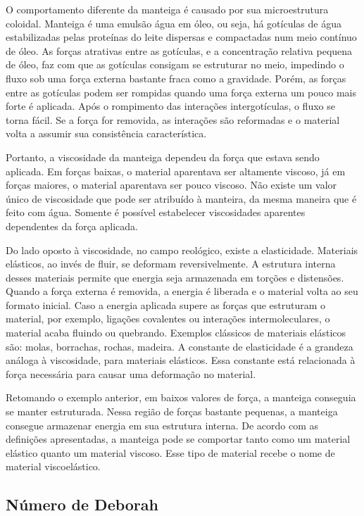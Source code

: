 		O comportamento diferente da manteiga é causado por sua microestrutura coloidal. Manteiga é uma emulsão água em óleo, ou seja, há gotículas de água estabilizadas pelas proteínas do leite dispersas e compactadas num meio contínuo de óleo. As forças atrativas entre as gotículas, e a concentração relativa pequena de óleo, faz com que as gotículas consigam se estruturar no meio, impedindo o fluxo sob uma força externa bastante fraca como a gravidade. Porém, as forças entre as gotículas podem ser rompidas quando uma força externa um pouco mais forte é aplicada. Após o rompimento das interações intergotículas, o fluxo se torna fácil. Se a força for removida, as interações são reformadas e o material volta a assumir sua consistência característica.
		
		Portanto, a viscosidade da manteiga dependeu da força que estava sendo aplicada. Em forças baixas, o material aparentava ser altamente viscoso, já em forças maiores, o material aparentava ser pouco viscoso. Não existe um valor único de viscosidade que pode ser atribuído à manteira, da mesma maneira que é feito com água. Somente é possível estabelecer viscosidades aparentes dependentes da força aplicada.
		
		Do lado oposto à viscosidade, no campo reológico, existe a elasticidade. Materiais elásticos, ao invés de fluir, se deformam reversivelmente. A estrutura interna desses materiais permite que energia seja armazenada em torções e distensões. Quando a força externa é removida, a energia é liberada e o material volta ao seu formato inicial. Caso a energia aplicada supere as forças que estruturam o material, por exemplo, ligações covalentes ou interações intermoleculares, o material acaba fluindo ou quebrando. Exemplos clássicos de materiais elásticos são: molas, borrachas, rochas, madeira. A constante de elasticidade é a grandeza análoga à viscosidade, para materiais elásticos. Essa constante está relacionada à força necessária para causar uma deformação no material.

		Retomando o exemplo anterior, em baixos valores de força, a manteiga conseguia se manter estruturada. Nessa região de forças bastante pequenas, a manteiga consegue armazenar energia em sua estrutura interna. De acordo com as definições apresentadas, a manteiga pode se comportar tanto como um material elástico quanto um material viscoso. Esse tipo de material recebe o nome de material viscoelástico.
		
		\subsection{Número de Deborah}
		
